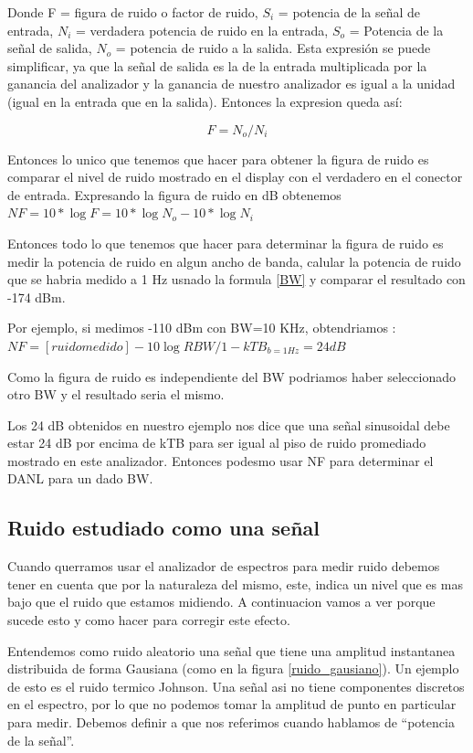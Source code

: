 \documentclass[a4paper,12pt,twoside]{article}
\newcommand{\quotes}[1]{``#1''}
\begin{document}
Donde F = figura de ruido o factor de ruido, $S_i$ = potencia de la señal de entrada, $N_i$ = verdadera potencia de ruido en la entrada, $S_o$ = Potencia de la señal de salida, $N_o$ = potencia de ruido a la salida. Esta expresión se puede simplificar, ya que la señal de salida es la de la entrada multiplicada por la ganancia del analizador y la ganancia de nuestro analizador es igual a la unidad (igual en la entrada que en la salida). Entonces la expresion queda así:

\begin{equation*}
F=N_o/N_i
\end{equation*}

Entonces lo unico que tenemos que hacer para obtener la figura de ruido es comparar el nivel de ruido mostrado en el display con el verdadero en el conector de entrada. Expresando la figura de ruido en dB obtenemos $NF=10*\log{F}=10*\log{N_o}-10*\log{N_i}$

Entonces todo lo que tenemos que hacer para determinar la figura de ruido es medir la potencia de ruido en algun ancho de banda, calular la potencia de ruido que se habria medido a 1 Hz usnado la formula \ref{BW} y comparar el resultado con -174 dBm.

Por ejemplo, si medimos -110 dBm con BW=10 KHz, obtendriamos : $NF=[ruido medido] - 10\log{RBW/1}- kTB_{b=1 Hz} = 24 dB$ 

Como la figura de ruido es independiente del BW podriamos haber seleccionado otro BW y el resultado seria el mismo.
 
Los 24 dB obtenidos en nuestro ejemplo nos dice que una señal sinusoidal debe estar 24 dB por encima de kTB para ser igual al piso de ruido promediado  mostrado en este analizador. Entonces podesmo usar NF para determinar el DANL para un dado BW.

\subsection{Ruido estudiado como una señal}

Cuando querramos usar el analizador de espectros para medir ruido debemos tener en cuenta que por la naturaleza del mismo, este, indica un nivel que es mas bajo que el ruido que estamos midiendo. A continuacion vamos a ver porque sucede esto y como hacer para corregir este efecto.

Entendemos como ruido aleatorio una señal que tiene una amplitud instantanea distribuida de forma Gausiana (como en la figura \ref{ruido_gausiano}). Un ejemplo de esto es el ruido termico Johnson. Una señal asi no tiene componentes discretos en el espectro, por lo que no podemos tomar la amplitud de punto en particular para medir.
Debemos definir a que nos referimos cuando hablamos de \quotes{potencia de la señal}.
\end{document}
